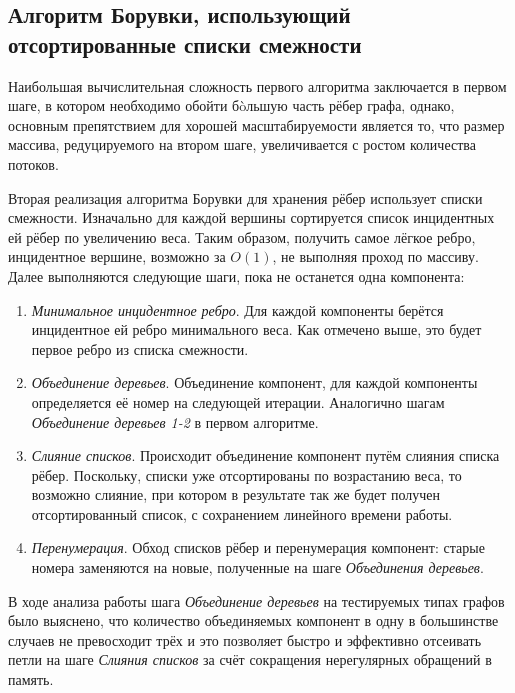 \documentclass{article}
\begin{document}

\subsection{Алгоритм Борувки, использующий отсортированные списки смежности}
Наибольшая вычислительная сложность первого алгоритма заключается в первом шаге, в котором необходимо обойти б\`oльшую часть рёбер графа, однако, основным препятствием для хорошей масштабируемости является то, что размер массива, редуцируемого на втором шаге, увеличивается с ростом количества потоков.

Вторая реализация алгоритма Борувки для хранения рёбер использует списки смежности. 
Изначально для каждой вершины сортируется список инцидентных ей рёбер по увеличению веса. 
Таким образом, получить самое лёгкое ребро, инцидентное вершине, возможно за $O(1)$, не выполняя проход по массиву.
Далее выполняются следующие шаги, пока не останется одна компонента:
\begin{enumerate}
    \item \textit{Минимальное инцидентное ребро}.
        Для каждой компоненты берётся инцидентное ей ребро минимального веса. Как отмечено выше, это будет первое ребро из списка смежности.
    \item \textit{Объединение деревьев}.
        Объединение компонент, для каждой компоненты определяется её номер на следующей итерации. 
        Аналогично шагам \textit{Объединение деревьев 1-2} в первом алгоритме.
    \item \textit{Слияние списков}.
        Происходит объединение компонент путём слияния списка рёбер. 
        Поскольку, списки уже отсортированы по возрастанию веса, то возможно слияние, при котором в результате так же будет получен отсортированный список, с сохранением линейного времени работы.
    \item \textit{Перенумерация}.
        Обход списков рёбер и перенумерация компонент: старые номера заменяются на новые, полученные на шаге \textit{Объединения деревьев}.
\end{enumerate}

В ходе анализа работы шага \textit{Объединение деревьев} на тестируемых типах графов было выяснено, что количество объединяемых компонент в одну в большинстве случаев не превосходит трёх и это позволяет быстро и эффективно отсеивать петли на шаге \textit{Слияния списков} за счёт сокращения нерегулярных обращений в память.
\end{document}
